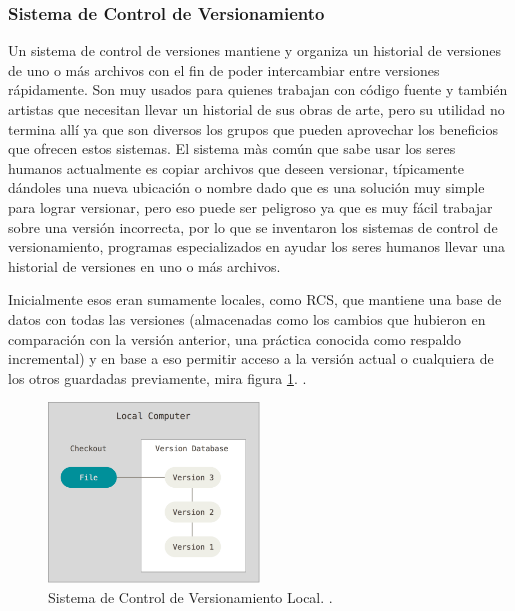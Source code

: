 \subsubsection{Sistema de Control de Versionamiento}
Un sistema de control de versiones mantiene y organiza un historial de versiones de uno o más archivos con el fin de poder intercambiar entre versiones rápidamente. Son muy usados para quienes trabajan con código fuente y también artistas \citep{PROGIT-Git-VCS} que necesitan llevar un historial de sus obras de arte, pero su utilidad no termina allí ya que son diversos los grupos que pueden aprovechar los beneficios que ofrecen estos sistemas. El sistema màs común que sabe usar los seres humanos actualmente es copiar archivos que deseen versionar, típicamente dándoles una nueva ubicación o nombre dado que es una solución muy simple para lograr versionar, pero eso puede ser peligroso ya que es muy fácil trabajar sobre una versión incorrecta, por lo que se inventaron los sistemas de control de versionamiento, programas especializados en ayudar los seres humanos llevar una historial de versiones en uno o más archivos.

Inicialmente esos eran sumamente locales, como RCS, que mantiene una base de datos con todas las versiones (almacenadas como los cambios que hubieron en comparación con la versión anterior, una práctica conocida como respaldo incremental) y en base a eso permitir acceso a la versión actual o cualquiera de los otros guardadas previamente, mira figura \ref{LVCS}. \citep{PROGIT-Git-VCS}.

\begin{figure}
  \begin{center}
    \includegraphics[width=0.5\textwidth]{Figures/lvcs.png}
  \end{center}
  \caption{Sistema de Control de Versionamiento Local. \citep{PROGIT-Git-VCS}.}
  \label{LVCS}
\end{figure}

